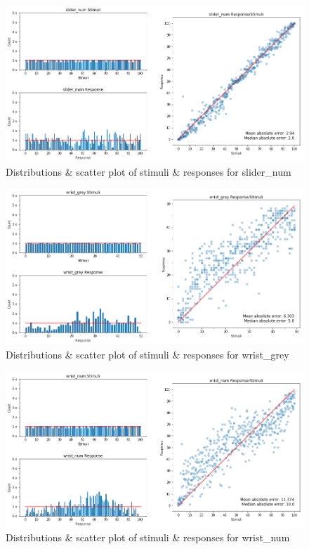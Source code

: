 \begin{figure}[p]
    \centering
    \includegraphics[width=1.2\textwidth]{figures/dist_scatter2.png}
    \caption{Distributions \& scatter plot of stimuli \& responses for slider\_num}
    \label{dist_scatter2}
\end{figure}

\begin{figure}[p]
    \centering
    \includegraphics[width=1.2\textwidth]{figures/dist_scatter3.png}
    \caption{Distributions \& scatter plot of stimuli \& responses for wrist\_grey}
    \label{dist_scatter3}
\end{figure}

\begin{figure}[p]
    \centering
    \includegraphics[width=1.2\textwidth]{figures/dist_scatter4.png}
    \caption{Distributions \& scatter plot of stimuli \& responses for wrist\_num}
    \label{dist_scatter4}
\end{figure}

